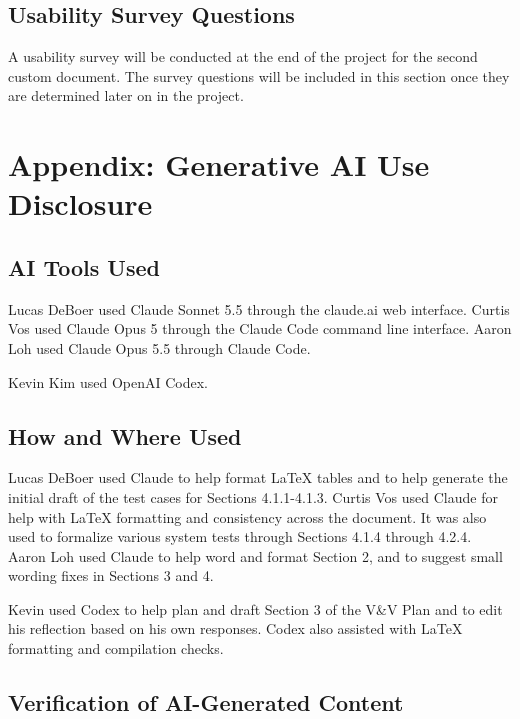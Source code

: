 \documentclass[12pt, titlepage]{article}
\begin{document}
\subsection{Usability Survey Questions}

A usability survey will be conducted at the end of the project for the second custom document. The survey questions will be included in this section 
once they are determined later on in the project.

\newpage{}

\section{Appendix: Generative AI Use Disclosure}

\subsection{AI Tools Used}

Lucas DeBoer used Claude Sonnet 5.5 through the claude.ai web interface.
Curtis Vos used Claude Opus 5 through the Claude Code command line interface.
Aaron Loh used Claude Opus 5.5 through Claude Code.

Kevin Kim used OpenAI Codex.

\subsection{How and Where Used}
Lucas DeBoer used Claude to help format LaTeX tables and to help generate the initial draft of the test cases for Sections 4.1.1-4.1.3.
Curtis Vos used Claude for help with LaTeX formatting and consistency across the document. It was also used to formalize various system tests through Sections 4.1.4 through 4.2.4.
Aaron Loh used Claude to help word and format Section 2, and to suggest small wording fixes in Sections 3 and 4.

Kevin used Codex to help plan and draft Section 3 of the V\&V Plan and to
edit his reflection based on his own responses. Codex also assisted with
LaTeX formatting and compilation checks.

\subsection{Verification of AI-Generated Content}
\end{document}
